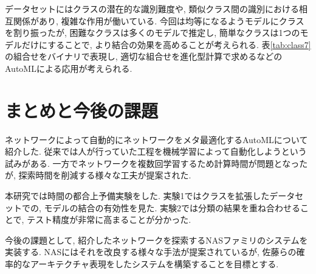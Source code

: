 \documentclass[twocolumn]{jarticle}     %
\begin{document}
データセットにはクラスの潜在的な識別難度や, 類似クラス間の識別における相互関係があり, 複雑な作用が働いている.
今回は均等になるようモデルにクラスを割り振ったが,
困難なクラスは多くのモデルで推定し, 簡単なクラスは1つのモデルだけにすることで, より結合の効果を高めることが考えられる.
表\ref{tab:class7}の組合せをバイナリで表現し, 適切な組合せを進化型計算で求めるなどのAutoMLによる応用が考えられる.

\section{まとめと今後の課題}

ネットワークによって自動的にネットワークをメタ最適化するAutoMLについて紹介した.
従来では人が行っていた工程を機械学習によって自動化しようという試みがある.
一方でネットワークを複数回学習するため計算時間が問題となったが, 探索時間を削減する様々な工夫が提案された.

本研究では時間の都合上予備実験をした.
実験1ではクラスを拡張したデータセットでの, モデルの結合の有効性を見た.
実験2では分類の結果を重ね合わせることで, テスト精度が非常に高まることが分かった.

今後の課題として,
紹介したネットワークを探索するNASファミリのシステムを実装する.
NASにはそれを改良する様々な手法が提案されているが,
佐藤ら\cite{ANAS}の確率的なアーキテクチャ表現をしたシステムを構築することを目標とする.



\end{document}
